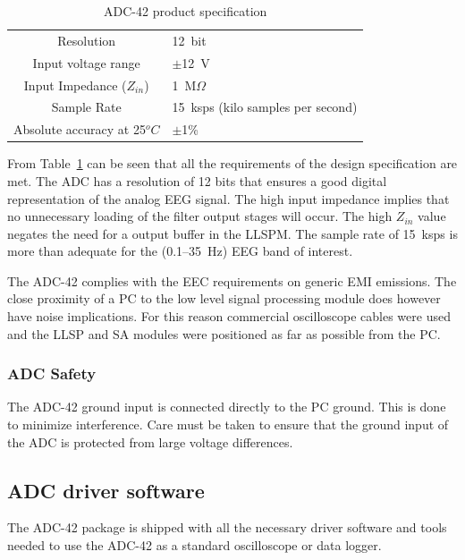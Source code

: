 \begin{table}
\begin{center}	
	\begin{tabular}[htpb]{|c|l|} \hline
		Resolution & 12~bit \\
		Input voltage range & $\pm$12~V \\
		Input Impedance ($Z_{in}$) & 1~M$\Omega$ \\
		Sample Rate & 15~ksps (kilo samples per second) \\
		Absolute accuracy at 25$^oC$ & $\pm$1\% \\
		\hline		
	\end{tabular}
	\caption{ADC-42 product specification}
	\label{table:adc42}
\end{center}	
\end{table}

From Table~\ref{table:adc42} can be seen that all the requirements of
the design specification are met. The ADC has a resolution of 12 bits
that ensures a good digital representation of the analog EEG
signal. The high input impedance implies that no unnecessary loading
of the filter output stages will occur. The high $Z_{in}$ value
negates the need for a output buffer in the LLSPM. The sample rate of
15~ksps is more than adequate for the (0.1--35~Hz) EEG band of
interest.

The ADC-42 complies with the EEC requirements on generic EMI
emissions. The close proximity of a PC to the low level signal
processing module does however have noise implications. For this
reason commercial oscilloscope cables were used and the LLSP and SA
modules were positioned as far as possible from the PC.

\subsubsection{ADC Safety}
The ADC-42 ground input is connected directly to the PC ground. This is
done to minimize interference. Care must be taken to ensure that the
ground input of the ADC is protected from large voltage
differences. 

\subsection{ADC driver software}

The ADC-42 package is shipped with all the necessary driver software
and tools needed to use the ADC-42 as a standard oscilloscope or data
logger. 


